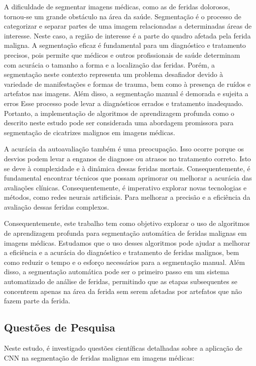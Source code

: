 A dificuldade de segmentar imagens médicas, como as de feridas dolorosos, tornou-se um grande obstáculo na área da saúde. Segmentação é o processo de categorizar e separar partes de uma imagem relacionadas a determinadas áreas de interesse. Neste caso, a região de interesse é a parte do quadro afetada pela ferida maligna. A segmentação eficaz é fundamental para um diagnóstico e tratamento precisos, pois permite que médicos e outros profissionais de saúde determinam com acurácia o tamanho a forma e a localização das feridas. Porém, a segmentação neste contexto representa um problema desafiador devido à variedade de manifestações e formas de trauma, bem como à presença de ruídos e artefatos nas imagens. Além disso, a segmentação manual é demorada e sujeita a erros Esse processo pode levar a diagnósticos errados e tratamento inadequado. Portanto, a implementação de algoritmos de aprendizagem profunda como o descrito neste estudo pode ser considerada uma abordagem promissora para segmentação de cicatrizes malignos em imagens médicas.

A acurácia da autoavaliação também é uma preocupação. Isso ocorre porque os desvios podem levar a enganos de diagnose ou atrasos no tratamento correto. Isto se deve à complexidade e à dinâmica dessas feridas mortais. Consequentemente, é fundamental encontrar técnicos que possam aprimorar ou melhorar a acurácia das avaliações clínicas. Consequentemente, é imperativo explorar novas tecnologias e métodos, como redes neurais artificiais. Para melhorar a precisão e a eficiência da avaliação dessas feridas complexos.

Consequentemente, este trabalho tem como objetivo explorar o uso de algoritmos de aprendizagem profunda para segmentação automática de feridas malignas em imagens médicas. Estudamos que o uso desses algoritmos pode ajudar a melhorar a eficiência e a acurácia do diagnóstico e tratamento de feridas malignos, bem como reduzir o tempo e o esforço necessários para a segmentação manual. Além disso, a segmentação automática pode ser o primeiro passo em um sistema automatizado de análise de feridas, permitindo que as etapas subsequentes se concentrem apenas na área da ferida sem serem afetadas por artefatos que não fazem parte da ferida.

 \subsection{Questões de Pesquisa}
Neste estudo, é investigado questões científicas detalhadas sobre a aplicação de \ac{CNN} na segmentação de feridas malignas em imagens médicas:

